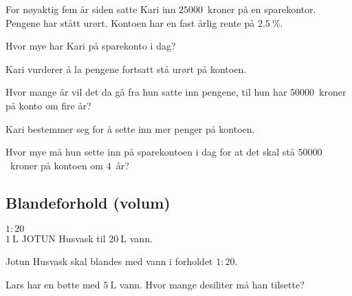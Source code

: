 For nøyaktig fem år siden satte Kari inn $\num{25000}$~kroner på en sparekontor.
Pengene har stått urørt. Kontoen har en fast årlig rente på
$\SI{2.5}{\percent}$.

\begin{oppgaver}
   Hvor mye har Kari på sparekonto i dag?
\end{oppgaver}

Kari vurderer å la pengene fortsatt stå urørt på kontoen.

\begin{oppgaver}
   Hvor mange år vil det da gå fra hun satte inn pengene, til hun har
    $\num{50000}$~kroner på konto om fire år?
\end{oppgaver}

Kari bestemmer seg for å sette inn mer penger på kontoen.

\begin{oppgaver}
   Hvor mye må hun sette inn på sparekontoen i dag for at det skal stå
    $\num{50000}$~kroner på kontoen om $4$~år?
\end{oppgaver}


\Oppgave[3]

\begin{center}\hspace*{0.5cm}
  \begin{minipage}[c]{0.3\textwidth}
    \centering{}
  \end{minipage}\hfill
  \begin{minipage}[c]{0.65\textwidth}
    \section*{Blandeforhold (volum)}
    $1 : 20$ \\
    $\SI{1}{\liter}$ JOTUN Husvask til $\SI{20}{\liter}$ vann.
  \end{minipage}\bigskip
\end{center}

Jotun Husvask skal blandes med vann i forholdet $1:20$.

\begin{oppgaver}
   Lars har en bøtte med $\SI{5}{\L}$ vann. Hvor mange desiliter må
    han tilsette?
\end{oppgaver}

